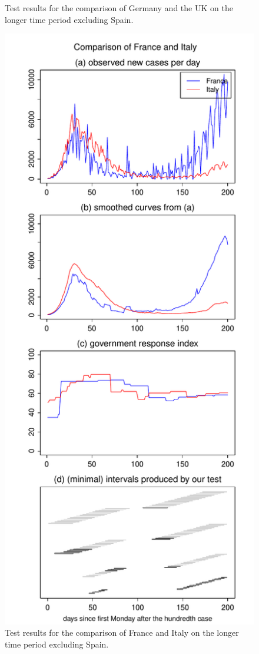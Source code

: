 \documentclass[a4paper,12pt]{article}
\numberwithin{equation}{section}
\begin{document}
{\begin{figure}[h!]
\begin{minipage}[t]{0.49\textwidth}
\caption{Test results for the comparison of Germany and the UK on the longer time period excluding Spain.}
\end{minipage}
\hspace{0.25cm}
\begin{minipage}[t]{0.49\textwidth}
\includegraphics[width=\textwidth]{plots/FRA_vs_ITA_four_countries}
\caption{Test results for the comparison of France and Italy on the longer time period excluding Spain.}
\end{minipage}
\end{figure}



}
\end{document}
